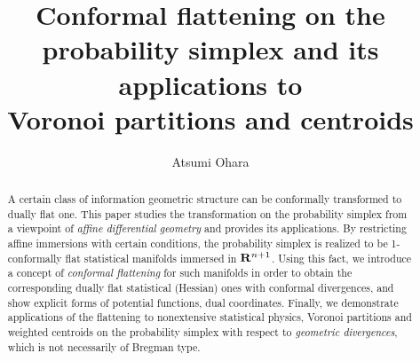 \documentclass{llncs}
\renewcommand{\today}{\number\month / \number\day / \number\year}
\begin{document}
\title{Conformal flattening on the probability simplex and 
its applications to \\ 
Voronoi partitions and centroids}
%

\author{Atsumi Ohara}
%



\maketitle              %
\begin{abstract}
A certain class of information geometric structure can be 
conformally transformed to dually flat one.
This paper studies the transformation on the probability simplex
from a viewpoint of {\em affine differential geometry} and provides 
its applications.
By restricting affine immersions with certain conditions,
the probability simplex is realized to be 1-conformally flat 
statistical manifolds immersed in ${\bf R}^{n+1}$.
Using this fact, we introduce a concept of {\em conformal flattening} 
for such manifolds in order to obtain the corresponding 
dually flat statistical (Hessian) ones with conformal divergences,
and show explicit forms of potential functions, dual coordinates.
Finally, we demonstrate applications of the flattening to
nonextensive statistical physics, Voronoi partitions and weighted centroids 
on the probability simplex with respect to {\em geometric divergences}, 
which is not necessarily of Bregman type.
\end{abstract}  
\end{document}
